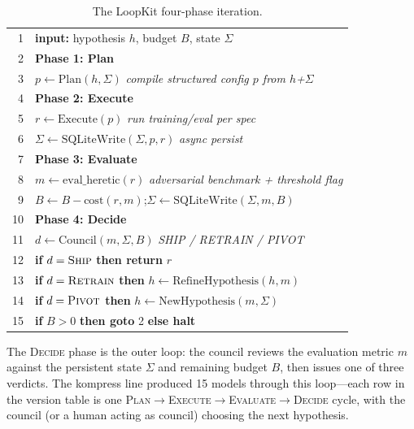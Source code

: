 \begin{table}[h]
\centering
\caption{The LoopKit four-phase iteration.}
\label{alg:fourphase}
\begin{tabular}{@{}r@{\hspace{1em}}l@{}}
\toprule
1  & \textbf{input:} hypothesis $h$, budget $B$, state $\Sigma$ \\
2  & \textbf{Phase 1: Plan} \\
3  & \quad $p \gets \mathrm{Plan}(h, \Sigma)$ \hfill {\footnotesize\textit{compile structured config $p$ from $h$+$\Sigma$}} \\
4  & \textbf{Phase 2: Execute} \\
5  & \quad $r \gets \mathrm{Execute}(p)$ \hfill {\footnotesize\textit{run training/eval per spec}} \\
6  & \quad $\Sigma \gets \mathrm{SQLiteWrite}(\Sigma, p, r)$ \hfill {\footnotesize\textit{async persist}} \\
7  & \textbf{Phase 3: Evaluate} \\
8  & \quad $m \gets \mathrm{eval\_heretic}(r)$ \hfill {\footnotesize\textit{adversarial benchmark + threshold flag}} \\
9  & \quad $B \gets B - \mathrm{cost}(r, m)$;\quad $\Sigma \gets \mathrm{SQLiteWrite}(\Sigma, m, B)$ \\
10 & \textbf{Phase 4: Decide} \\
11 & \quad $d \gets \mathrm{Council}(m, \Sigma, B)$ \hfill {\footnotesize\textit{SHIP / RETRAIN / PIVOT}} \\
12 & \quad \textbf{if} $d = \textsc{Ship}$ \textbf{then return} $r$ \\
13 & \quad \textbf{if} $d = \textsc{Retrain}$ \textbf{then} $h \gets \mathrm{RefineHypothesis}(h, m)$ \\
14 & \quad \textbf{if} $d = \textsc{Pivot}$ \textbf{then} $h \gets \mathrm{NewHypothesis}(m, \Sigma)$ \\
15 & \textbf{if} $B > 0$ \textbf{then goto} 2 \textbf{else halt} \\
\bottomrule
\end{tabular}
\end{table}

The \textsc{Decide} phase is the outer loop: the council reviews the
evaluation metric $m$ against the persistent state $\Sigma$ and remaining
budget $B$, then issues one of three verdicts. The kompress line produced 15
models through this loop---each row in the version table is one
\textsc{Plan}$\to$\textsc{Execute}$\to$\textsc{Evaluate}$\to$\textsc{Decide}
cycle, with the council (or a human acting as council) choosing the next
hypothesis.

